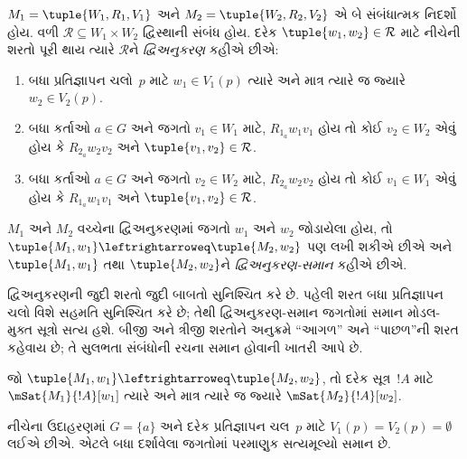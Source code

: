 \begin{defn}[દ્વિઅનુકરણ]
$M_1 = \tuple{W_1, R_1, V_1}$ અને $M_2 = \tuple{W_2, R_2, V_2}$
એ બે સંબંધાત્મક નિદર્શો હોય. વળી $\mathcal{R} \subseteq W_1 \times W_2$
દ્વિસ્થાની સંબંધ હોય. દરેક $\tuple{w_1, w_2} \in \mathcal{R}$
માટે નીચેની શરતો પૂરી થાય ત્યારે $\mathcal{R}$ને
\emph{દ્વિઅનુકરણ} કહીએ છીએ:

\begin{enumerate}
  \item બધા પ્રતિજ્ઞાપન ચલો~$p$ માટે
  $w_1 \in V_1(p)$ ત્યારે અને માત્ર ત્યારે જ જ્યારે $w_2 \in V_2(p)$.
  \item બધા કર્તાઓ $a \in G$ અને જગતો $v_1 \in W_1$ માટે,
  $R_{1_a} w_1 v_1$ હોય તો કોઈ $v_2 \in W_2$ એવું હોય કે
  $R_{2_a} w_2 v_2$ અને $\tuple{v_1, v_2} \in
  \mathcal{R}$.
  \item બધા કર્તાઓ $a \in G$ અને જગતો $v_2 \in W_2$ માટે,
  $R_{2_a} w_2 v_2$ હોય તો કોઈ $v_1 \in W_1$ એવું હોય કે
  $R_{1_a} w_1 v_1$ અને $\tuple{v_1, v_2} \in
  \mathcal{R}$.
\end{enumerate}

$M_1$ અને $M_2$ વચ્ચેના દ્વિઅનુકરણમાં જગતો $w_1$ અને $w_2$
જોડાયેલા હોય, તો $\tuple{M_1, w_1} \leftrightarroweq
\tuple{M_2, w_2}$ પણ લખી શકીએ છીએ અને $\tuple{M_1, w_1}$ તથા
$\tuple{M_2, w_2}$ને \emph{દ્વિઅનુકરણ-સમાન} કહીએ છીએ.
\end{defn}

દ્વિઅનુકરણની જુદી શરતો જુદી બાબતો સુનિશ્ચિત કરે છે.
પહેલી શરત બધા પ્રતિજ્ઞાપન ચલો વિશે સહમતિ
સુનિશ્ચિત કરે છે; તેથી દ્વિઅનુકરણ-સમાન જગતોમાં સમાન
મોડલ-મુક્ત સૂત્રો સત્ય હશે. બીજી અને ત્રીજી શરતોને અનુક્રમે
``આગળ'' અને ``પાછળ''ની શરત કહેવાય છે; તે સુલભતા સંબંધોની
રચના સમાન હોવાની ખાતરી આપે છે.

\begin{thm}
જો $\tuple{M_1, w_1} \leftrightarroweq \tuple{M_2, w_2}$, તો દરેક
સૂત્ર~$!A$ માટે $\mSat{M_1}{!A}[w_1]$ ત્યારે અને માત્ર
ત્યારે જ જ્યારે $\mSat{M_2}{!A}[w_2]$.
\end{thm}

નીચેના ઉદાહરણમાં $G=\{a\}$ અને દરેક પ્રતિજ્ઞાપન ચલ~$p$
માટે $V_1(p)=V_2(p)=\emptyset$ લઈએ છીએ. એટલે બધા દર્શાવેલા
જગતોમાં પરમાણુક સત્યમૂલ્યો સમાન છે.


